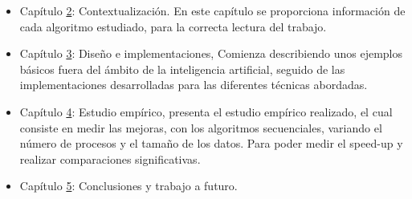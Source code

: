 	
	\begin{itemize}
		\item Capítulo \hyperref[cap:c2_context]{2}: Contextualización. En este capítulo se proporciona información de cada algoritmo estudiado, para la correcta lectura del trabajo.
		\item Capítulo \hyperref[cap:c3_implementaciones]{3}: Diseño e implementaciones, Comienza describiendo unos ejemplos básicos fuera del ámbito de la inteligencia artificial, seguido de las implementaciones desarrolladas para las diferentes técnicas abordadas.
		\item Capítulo \hyperref[cap:c4_estudio]{4}: Estudio empírico, presenta el estudio empírico realizado, el cual consiste en medir las mejoras, con los algoritmos secuenciales, variando el número de procesos y el tamaño de los datos. Para poder medir el speed-up y realizar comparaciones significativas.
		\item Capítulo \hyperref[cap:c5_conclu]{5}: Conclusiones y trabajo a futuro.
	\end{itemize}
















